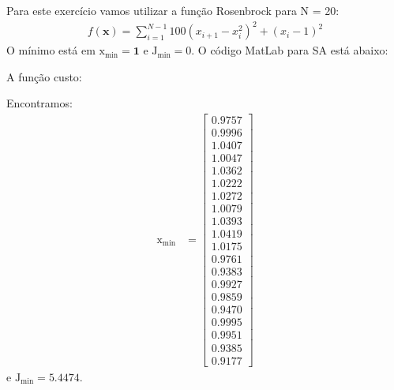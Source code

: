 \documentclass[12pt]{article}
\newenvironment{exercise}[2][Exercício]{\begin{trivlist}
\item[\hskip \labelsep {\bfseries #1}\hskip \labelsep {\bfseries #2.}]}{\end{trivlist}}
\begin{document}
\begin{exercise}{2}
Para este exercício vamos utilizar a função Rosenbrock para N = 20:
\begin{align*}
f(\textbf{x}) = \sum_{i=1}^{N-1} 100(x_{i+1}-x_i^2)^2 + (x_i-1)^2
\end{align*}
O mínimo está em $\text{x}_\text{min}= \textbf{1}$ e $\text{J}_\text{min} =
0$. 
O código MatLab para SA está abaixo:


A função custo:


Encontramos:
\begin{align*}
\text{x}_\text{min} &= \begin{bmatrix}
0.9757 \\ 0.9996 \\ 1.0407 \\ 1.0047 \\ 1.0362 \\ 1.0222 \\ 1.0272 \\ 1.0079 \\   
1.0393 \\ 1.0419 \\ 1.0175 \\ 0.9761 \\ 0.9383 \\ 0.9927 \\ 0.9859 \\ 0.9470 \\   
0.9995 \\ 0.9951 \\ 0.9385 \\ 0.9177
\end{bmatrix}
\end{align*}
e $\text{J}_\text{min} = 5.4474$.


\end{exercise}
\end{document}
